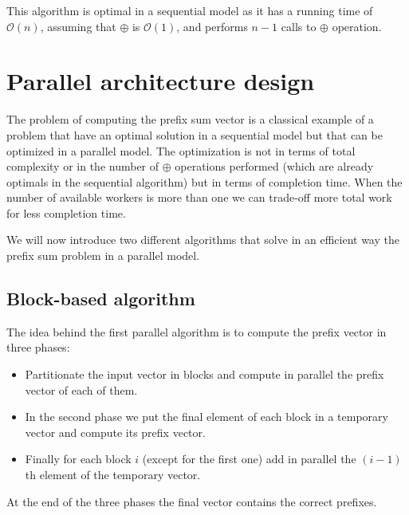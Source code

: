 \documentclass{article}
\begin{document}
This algorithm is optimal in a sequential model as it has a running time of $\mathcal{O}(n)$, assuming that $\oplus$ is $\mathcal{O}(1)$, and performs $n-1$ calls to $\oplus$ operation.
 
\section{Parallel architecture design}

The problem of computing the prefix sum vector is a classical example of a problem that have an optimal solution in a sequential model but that can be optimized in a parallel model. 
The optimization is not in terms of total complexity or in the number of $\oplus$ operations performed (which are already optimals in the sequential algorithm) but in terms of completion time. When the number of available workers is more than one we can trade-off more total work for less completion time.
\medskip

We will now introduce two different algorithms that solve in an efficient way the prefix sum problem in a parallel model. 

\subsection{Block-based algorithm}

The idea behind the first parallel algorithm is to compute the prefix vector in three phases:

\begin{itemize}
  \item Partitionate the input vector in blocks and compute in parallel the prefix vector of each of them.
  \item In the second phase we put the final element of each block in a temporary vector and compute its prefix vector.
  \item Finally for each block $i$ (except for the first one) add in parallel the $(i-1)$th element of the temporary vector.
\end{itemize}

At the end of the three phases the final vector contains the correct prefixes.
\end{document}

